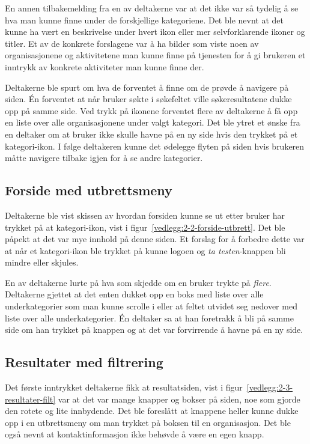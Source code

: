 En annen tilbakemelding fra en av deltakerne var at det ikke var så tydelig å se hva man kunne finne under de forskjellige kategoriene. Det ble nevnt at det kunne ha vært en beskrivelse under hvert ikon eller mer selvforklarende ikoner og titler. Et av de konkrete forslagene var å ha bilder som viste noen av organisasjonene og aktivitetene man kunne finne på tjenesten for å gi brukeren et inntrykk av konkrete aktiviteter man kunne finne der.

Deltakerne ble spurt om hva de forventet å finne om de prøvde å navigere på siden. Én forventet at når bruker søkte i søkefeltet ville søkeresultatene dukke opp på samme side. Ved trykk på ikonene forventet flere av deltakerne å få opp en liste over alle organisasjonene under valgt kategori. Det ble ytret et ønske fra en deltaker om at bruker ikke skulle havne på en ny side hvis den trykket på et kategori-ikon. I følge deltakeren kunne det ødelegge flyten på siden hvis brukeren måtte navigere tilbake igjen for å se andre kategorier.


\subsection{Forside med utbrettsmeny}

Deltakerne ble vist skissen av hvordan forsiden kunne se ut etter bruker har trykket på at kategori-ikon, vist i figur~\ref{vedlegg:2-2-forside-utbrett}. Det ble påpekt at det var mye innhold på denne siden. Et forslag for å forbedre dette var at når et kategori-ikon ble trykket på kunne logoen og {\em ta testen}-knappen bli mindre eller skjules. 

En av deltakerne lurte på hva som skjedde om en bruker trykte på {\em flere}. Deltakerne gjettet at det enten dukket opp en boks med liste over alle underkategorier som man kunne scrolle i eller at feltet utvidet seg nedover med liste over alle underkategorier. Én deltaker sa at han foretrakk å bli på samme side om han trykket på knappen og at det var forvirrende å havne på en ny side.


\subsection{Resultater med filtrering}
\label{section:test-resultater-2.0}

Det første inntrykket deltakerne fikk at resultatsiden, vist i figur~\ref{vedlegg:2-3-resultater-filt} var at det var mange knapper og bokser på siden, noe som gjorde den rotete og lite innbydende. Det ble foreslått at knappene heller kunne dukke opp i en utbrettsmeny om man trykket på boksen til en organisasjon. Det ble også nevnt at kontaktinformasjon ikke behøvde å være en egen knapp.

